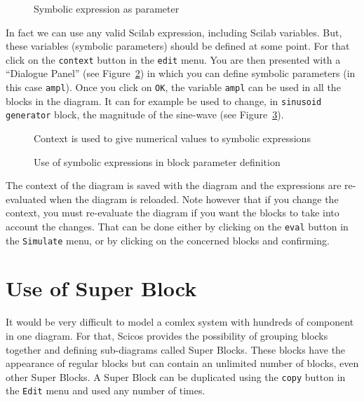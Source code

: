 \documentclass{book}
\begin{document}
  \begin{figure}[htbp]
  \centerline{}
  \caption{Symbolic expression as parameter}
 \label{para1}
  \end{figure}

In fact we can use any valid Scilab expression, including Scilab variables. But,
these variables (symbolic parameters) should be defined at some point. For that
click on the {\tt context} button in the 
{\tt edit} menu. You are then
presented with a ``Dialogue Panel'' (see Figure~\ref{ampl}) in which you
can define symbolic parameters (in this case {\tt ampl}). Once you
click on {\tt OK}, the variable {\tt ampl} can be used in all the
blocks in the diagram. It can for example be used to change, in {\tt sinusoid generator} block,
the magnitude of the sine-wave (see Figure~\ref{ampl2}).


  \begin{figure}[htbp]
  \centerline{}
  \caption{Context is used to give numerical values to symbolic expressions}
 \label{ampl}
  \end{figure}

  \begin{figure}[htbp]
  \centerline{}
  \caption{Use of symbolic expressions in block parameter definition}
 \label{ampl2}
  \end{figure}

The context of the diagram is saved with the diagram and the expressions
are re-evaluated when the diagram is reloaded. Note however that if you
change the context, you must re-evaluate the diagram if you want the
blocks to take into account the changes. That can be done either by
clicking on the {\tt eval} button in the {\tt Simulate} menu, or by
clicking on the concerned blocks and confirming.

\section{Use of Super Block}
It would be very difficult to model a comlex system with hundreds of
component in one diagram. For that, Scicos provides the possibility
of grouping blocks together and defining sub-diagrams called Super Blocks.
These blocks have the appearance of regular blocks but can contain
an unlimited number of blocks, even other Super Blocks. A Super Block can be
duplicated using the {\tt copy} button in the {\tt Edit} menu and used any
number of times.
\end{document}
